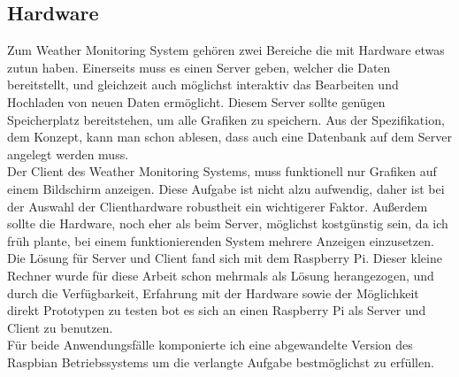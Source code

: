 \subsection{Hardware}
Zum Weather Monitoring System gehören zwei Bereiche die mit Hardware etwas zutun haben.
Einerseits muss es einen Server geben, welcher die Daten bereitstellt,
und gleichzeit auch möglichst interaktiv das Bearbeiten und Hochladen von neuen Daten ermöglicht.
Diesem Server sollte genügen Speicherplatz bereitstehen,
um alle Grafiken zu speichern.
Aus der Spezifikation, dem Konzept, kann man schon ablesen, dass auch eine Datenbank auf dem
Server angelegt werden muss.\\
Der Client des Weather Monitoring Systems, muss funktionell nur Grafiken auf einem Bildschirm anzeigen.
Diese Aufgabe ist nicht alzu aufwendig,
daher ist bei der Auswahl der Clienthardware robustheit ein wichtigerer Faktor.
Außerdem sollte die Hardware, noch eher als beim Server, möglichst kostgünstig sein,
da ich früh plante, bei einem funktionierenden System mehrere Anzeigen einzusetzen.
Die Lösung für Server und Client fand sich mit dem Raspberry Pi.
Dieser kleine Rechner wurde für diese Arbeit schon mehrmals als Lösung herangezogen,
und durch die Verfügbarkeit,
Erfahrung mit der Hardware sowie der Möglichkeit direkt Prototypen
zu testen bot es sich an einen Raspberry Pi als Server und Client zu benutzen.\\
Für beide Anwendungsfälle komponierte ich eine abgewandelte
Version des Raspbian Betriebssystems um die verlangte Aufgabe bestmöglichst zu erfüllen.


